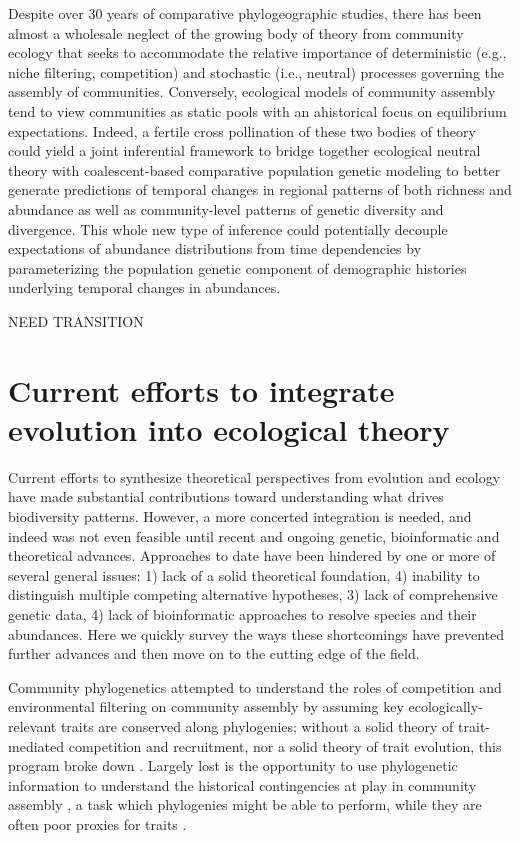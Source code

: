\documentclass[12pt]{article}
\begin{document}
Despite over 30 years of comparative phylogeographic studies, there
has been almost a wholesale neglect of the growing body of theory from
community ecology that seeks to accommodate the relative importance of
deterministic (e.g., niche filtering, competition) and stochastic
(i.e., neutral) processes governing the assembly of
communities. Conversely, ecological models of community assembly tend
to view communities as static pools with an ahistorical focus on
equilibrium expectations.  Indeed, a fertile cross pollination of
these two bodies of theory could yield a joint inferential framework
to bridge together ecological neutral theory with coalescent-based
comparative population genetic modeling to better generate predictions
of temporal changes in regional patterns of both richness and
abundance as well as community-level patterns of genetic diversity and
divergence. This whole new type of inference could potentially
decouple expectations of abundance distributions from time
dependencies by parameterizing the population genetic component of
demographic histories underlying temporal changes in abundances.

NEED TRANSITION

\section{Current efforts to integrate evolution into ecological theory}

Current efforts to synthesize theoretical perspectives from evolution
and ecology have made substantial contributions toward understanding
what drives biodiversity patterns. However, a more concerted
integration is needed, and indeed was not even feasible until recent
and ongoing genetic, bioinformatic and theoretical
advances. Approaches to date have been hindered by one or more of
several general issues: 1) lack of a solid theoretical foundation, 4)
inability to distinguish multiple competing alternative hypotheses, 3)
lack of comprehensive genetic data, 4) lack of bioinformatic
approaches to resolve species and their abundances. Here we quickly
survey the ways these shortcomings have prevented further advances and
then move on to the cutting edge of the field.

Community phylogenetics \cite{Webb2002-yr} attempted to understand the
roles of competition and environmental filtering on community assembly
by assuming key ecologically-relevant traits are conserved along
phylogenies; without a solid theory of trait-mediated competition and
recruitment, nor a solid theory of trait evolution, this program broke
down \cite{Losos2008-eq}. Largely lost is the opportunity to use
phylogenetic information to understand the historical contingencies at
play in community assembly \cite{Ricklefs2007-wo,Emerson2008-as}, a
task which phylogenies might be able to perform, while they are often
poor proxies for traits \cite{Losos2008-eq}.
\end{document}
